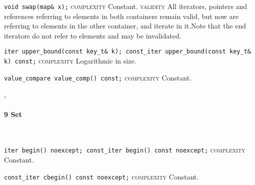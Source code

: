 \noindent{}\hspace*{0.25em}\lstinline[basicstyle=\ttfamily\color{cgreen}]{void swap(map& x);} \textsc{complexity} Constant. \textsc{validity} All iterators, pointers and references referring to elements in both containers remain valid, but now are referring to elements in the other container, and iterate in it.Note that the end iterators do not refer to elements and may be invalidated.\\\vspace{-0.6em}

\noindent{}\hspace*{0.25em}\lstinline[basicstyle=\ttfamily\color{clime}]{iter upper_bound(const key_t& k); const_iter upper_bound(const key_t& k) const;} \textsc{complexity} Logarithmic in size.\\\vspace{-0.6em}

\noindent{}\hspace*{0.25em}\lstinline[basicstyle=\ttfamily\color{cgreen}]{value_compare value_comp() const;} \textsc{complexity} Constant.\\\vspace{-0.6em}


\sep
{}
\paragraph{9 Set}\mbox{}\vspace{0.5em}\\
\noindent{}\hspace*{0.25em}\lstinline[basicstyle=\ttfamily\color{cgreen}]{iter begin() noexcept; const_iter begin() const noexcept;} \textsc{complexity} Constant.\\\vspace{-0.6em}

\noindent{}\hspace*{0.25em}\lstinline[basicstyle=\ttfamily\color{cgreen}]{const_iter cbegin() const noexcept;} \textsc{complexity} Constant.\\\vspace{-0.6em}

